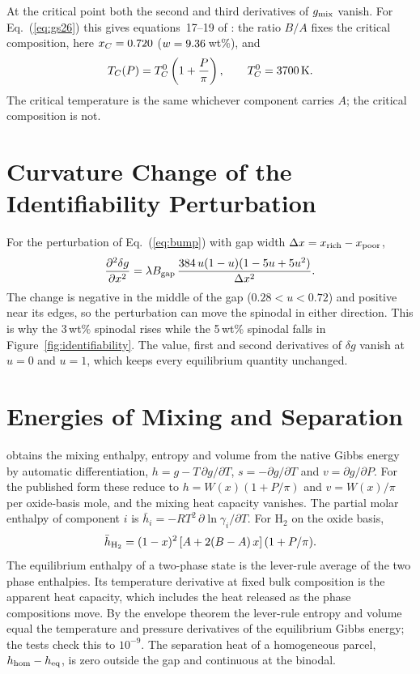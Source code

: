 At the critical point both the second and third derivatives of $g_{\rm mix}$ vanish. For
Eq.~(\ref{eq:gs26}) this gives equations~17--19 of \cite{gilmore2026}: the ratio $B/A$ fixes
the critical composition, here $x_C = 0.720{}$ ($w = 9.36{}$\,wt\%), and
\begin{equation}
T_C(P) = T_C^0\left(1+\frac{P}{\pi}\right), \qquad T_C^0 = 3700{}\,{\rm K}.
\end{equation}
The critical temperature is the same whichever component carries $A$; the critical
composition is not.

\section{Curvature Change of the Identifiability Perturbation}

For the perturbation of Eq.~(\ref{eq:bump}) with gap width $\Delta x = x_{\rm rich} -
x_{\rm poor}$,
\begin{equation}
\frac{\partial^2 \delta g}{\partial x^2}
= \lambda B_{\rm gap}\,\frac{384\,u(1-u)(1-5u+5u^2)}{\Delta x^2}.
\end{equation}
The change is negative in the middle of the gap ($0.28 < u < 0.72$) and positive near its
edges, so the perturbation can move the spinodal in either direction. This is why the 3\,wt\% spinodal
rises while the 5\,wt\% spinodal falls in Figure~\ref{fig:identifiability}. The value,
first and second derivatives of $\delta g$ vanish at $u=0$ and $u=1$, which keeps every
equilibrium quantity unchanged.

\section{Energies of Mixing and Separation}\label{app:energy}

\Atm{} obtains the mixing enthalpy, entropy and volume from the native Gibbs energy by
automatic differentiation, $h = g - T\,\partial g/\partial T$, $s = -\partial g/\partial T$ and
$v = \partial g/\partial P$. For the published form these reduce to $h = W(x)(1+P/\pi)$ and
$v = W(x)/\pi$ per oxide-basis mole, and the mixing heat capacity vanishes. The partial molar
enthalpy of component $i$ is $\bar h_i = -RT^2\,\partial \ln\gamma_i/\partial T$. For H$_2$ on the
oxide basis,
\begin{equation}
\bar h_{\rm H_2} = (1-x)^2\,[A + 2(B-A)\,x]\,(1+P/\pi).
\end{equation}
The equilibrium enthalpy of a two-phase state is the lever-rule average of the two phase
enthalpies. Its temperature derivative at fixed bulk composition is the apparent heat capacity,
which includes the heat released as the phase compositions move. By the envelope theorem the
lever-rule entropy and volume equal the temperature and pressure derivatives of the equilibrium
Gibbs energy; the tests check this to $10^{-9}$. The separation heat of a homogeneous parcel,
$h_{\rm hom} - h_{\rm eq}$, is zero outside the gap and continuous at the binodal.

